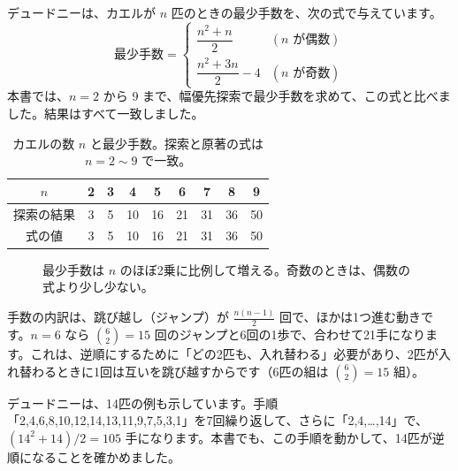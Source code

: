 \documentclass[a4paper,11pt,openany]{ltjsbook}
\begin{document}
デュードニーは、カエルが $n$ 匹のときの最少手数を、次の式で与えています。
\[
\text{最少手数}=
\begin{cases}
\dfrac{n^2+n}{2} & (n\text{ が偶数})\\[2mm]
\dfrac{n^2+3n}{2}-4 & (n\text{ が奇数})
\end{cases}
\]
本書では、$n=2$ から $9$ まで、幅優先探索で最少手数を求めて、この式と比べました。結果はすべて一致しました。

\begin{table}[htbp]
\centering
\begin{tabular}{c|cccccccc}
\toprule
$n$ & 2 & 3 & 4 & 5 & 6 & 7 & 8 & 9\\
\midrule
探索の結果 & 3 & 5 & 10 & 16 & 21 & 31 & 36 & 50\\
式の値 & 3 & 5 & 10 & 16 & 21 & 31 & 36 & 50\\
\bottomrule
\end{tabular}
\caption{カエルの数 $n$ と最少手数。探索と原著の式は $n=2\sim9$ で一致。}
\end{table}

\begin{figure}[htbp]
\centering
{}
\caption{最少手数は $n$ のほぼ2乗に比例して増える。奇数のときは、偶数の式より少し少ない。}
\end{figure}

手数の内訳は、跳び越し（ジャンプ）が $\tfrac{n(n-1)}{2}$ 回で、ほかは1つ進む動きです。$n=6$ なら $\binom62=15$ 回のジャンプと6回の1歩で、合わせて21手になります。これは、逆順にするために「どの2匹も、入れ替わる」必要があり、2匹が入れ替わるときに1回は互いを跳び越すからです（6匹の組は $\binom62=15$ 組）。

デュードニーは、14匹の例も示しています。手順「2,4,6,8,10,12,14,13,11,9,7,5,3,1」を7回繰り返して、さらに「2,4,\ldots,14」で、$(14^2+14)/2=105$ 手になります。本書でも、この手順を動かして、14匹が逆順になることを確かめました。
\end{document}
